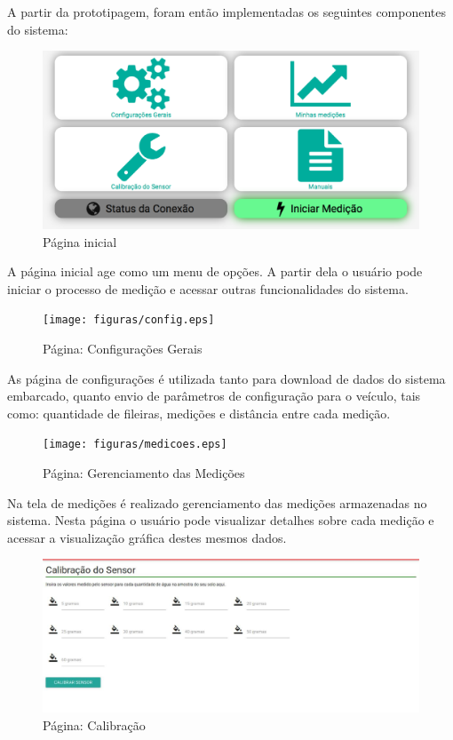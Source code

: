   A partir da prototipagem, foram então implementadas os seguintes componentes
  do sistema:

  \begin{figure}[!htbp]
  \begin{center}
  \includegraphics[width=.6\textwidth]{figuras/index.eps}
  \caption{\label{fig:print_index}Página inicial}
  \end{center}
  \end{figure}

  A página inicial age como um menu de opções. A partir dela o usuário pode
  iniciar o processo de medição e acessar outras funcionalidades do sistema.

  \begin{figure}[!htbp]
  \begin{center}
  \texttt{[image: figuras/config.eps]}
  \caption{\label{fig:print_config}Página: Configurações Gerais}
  \end{center}
  \end{figure}

  As página de configurações é utilizada tanto para download de dados do sistema
  embarcado, quanto envio de parâmetros de configuração para o veículo, tais como:
  quantidade de fileiras, medições e distância entre cada medição.

  \begin{figure}[!htbp]
  \begin{center}
  \texttt{[image: figuras/medicoes.eps]}
  \caption{\label{fig:print_medicoes}Página: Gerenciamento das Medições}
  \end{center}
  \end{figure}

  Na tela de medições é realizado gerenciamento das medições armazenadas
  no sistema. Nesta página o usuário pode visualizar detalhes sobre cada medição e
  acessar a visualização gráfica destes mesmos dados.

	\begin{figure}[!htbp]
  \begin{center}
  \includegraphics[width=.7\textwidth]{figuras/calibracao.eps}
  \caption{\label{fig:print_calibracao}Página: Calibração}
  \end{center}
  \end{figure}

